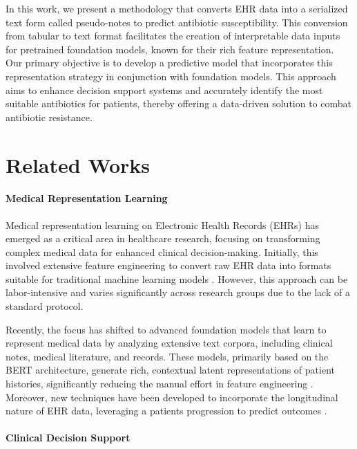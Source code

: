 \documentclass{article}
\theoremstyle{plain}
\theoremstyle{definition}
\theoremstyle{remark}
\begin{document}
In this work, we present a methodology that converts EHR data into a serialized text form called pseudo-notes to predict antibiotic susceptibility. This conversion from tabular to text format facilitates the creation of interpretable data inputs for pretrained foundation models, known for their rich feature representation. Our primary objective is to develop a predictive model that incorporates this representation strategy in conjunction with foundation models. This approach aims to enhance decision support systems and accurately identify the most suitable antibiotics for patients, thereby offering a data-driven solution to combat antibiotic resistance.

\section{Related Works}

\paragraph{Medical Representation Learning}

Medical representation learning on Electronic Health Records (EHRs) has emerged as a critical area in healthcare research, focusing on transforming complex medical data for enhanced clinical decision-making. Initially, this involved extensive feature engineering to convert raw EHR data into formats suitable for traditional machine learning models \cite{tang2020democratizing, ferrao2016preprocessing}. However, this approach can be labor-intensive and varies significantly across research groups due to the lack of a standard protocol. 

Recently, the focus has shifted to advanced foundation models that learn to represent medical data by analyzing extensive text corpora, including clinical notes, medical literature, and records. These models, primarily based on the BERT architecture, generate rich, contextual latent representations of patient histories, significantly reducing the manual effort in feature engineering  \cite{rasmy2021med,liu2021med,alsentzer2019publicly,lee2020biobert}. Moreover, new techniques have been developed to incorporate the longitudinal nature of EHR data, leveraging a patients progression to predict outcomes \cite{steinberg2023motor, wornow2024ehrshot, pang2021cehr, li2022hi}.

\paragraph{Clinical Decision Support}
\end{document}
